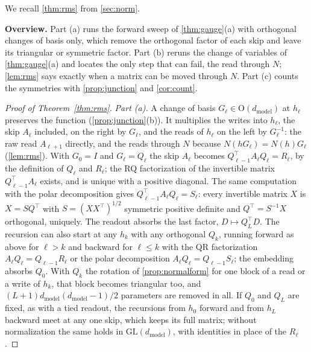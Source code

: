 \documentclass[10pt]{article}
\theoremstyle{definition}
\theoremstyle{remark}
\newcommand{\dm}{d_{\mathrm{model}}}
\newcommand{\GL}{\mathrm{GL}}
\newcommand{\Ort}{\mathrm{O}}
\newcommand{\para}[1]{\smallskip\noindent\textbf{#1}\hspace{0.5em}}
\begin{document}
We recall \cref{thm:rms} from \cref{sec:norm}.
\thmRMS*

\para{Overview.} Part (a) runs the forward sweep of \cref{thm:gauge}(a) with orthogonal changes of basis only, which remove the orthogonal factor of each skip and leave its triangular or symmetric factor. Part (b) reruns the change of variables of \cref{thm:gauge}(a) and locates the only step that can fail, the read through $N$; \cref{lem:rms} says exactly when a matrix can be moved through $N$. Part (c) counts the symmetries with \cref{prop:junction} and \cref{cor:count}.

\begin{proof}[Proof of Theorem~\ref{thm:rms}]
\emph{Part (a).} A change of basis $G_\ell \in \Ort(\dm)$ at $h_\ell$ preserves the function (\cref{prop:junction}(b)). It multiplies the writes into $h_\ell$, the skip $A_\ell$ included, on the right by $G_\ell$, and the reads of $h_\ell$ on the left by $G_\ell^{-1}$: the raw read $A_{\ell+1}$ directly, and the reads through $N$ because $N(hG_\ell) = N(h)G_\ell$ (\cref{lem:rms}). With $G_0 = I$ and $G_\ell = Q_\ell$ the skip $A_\ell$ becomes $Q_{\ell-1}^\top A_\ell Q_\ell = R_\ell$, by the definition of $Q_\ell$ and $R_\ell$; the RQ factorization of the invertible matrix $Q_{\ell-1}^\top A_\ell$ exists, and is unique with a positive diagonal. The same computation with the polar decomposition gives $Q_{\ell-1}^\top A_\ell Q_\ell = S_\ell$: every invertible matrix $X$ is $X = SQ^\top$ with $S = (XX^\top)^{1/2}$ symmetric positive definite and $Q^\top = S^{-1}X$ orthogonal, uniquely. The readout absorbs the last factor, $D \mapsto Q_L^\top D$. The recursion can also start at any $h_k$ with any orthogonal $Q_k$, running forward as above for $\ell > k$ and backward for $\ell \le k$ with the QR factorization $A_\ell Q_\ell = Q_{\ell-1}R_\ell$ or the polar decomposition $A_\ell Q_\ell = Q_{\ell-1}S_\ell$; the embedding absorbs $Q_0$. With $Q_k$ the rotation of \cref{prop:normalform} for one block of a read or a write of $h_k$, that block becomes triangular too, and $(L+1)\dm(\dm-1)/2$ parameters are removed in all. If $Q_0$ and $Q_L$ are fixed, as with a tied readout, the recursions from $h_0$ forward and from $h_L$ backward meet at any one skip, which keeps its full matrix; without normalization the same holds in $\GL(\dm)$, with identities in place of the $R_\ell$.


\end{proof}
\end{document}
